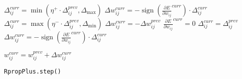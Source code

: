\begin{algorithm}
    \BlankLine
    \BlankLine

     { \BlankLine
         { \BlankLine \BlankLine
            $\Delta_{ij}^{curr} = \min(\eta^{+} \cdot \Delta_{ij}^{prev}, \Delta_{\max})$ \BlankLine
            $\Delta w_{ij}^{curr} = -\operatorname{sign}\left(\frac{\partial E}{\partial w_{ij}}^{curr}\right) \cdot \Delta_{ij}^{curr}$
        }
         { \BlankLine \BlankLine
            $\Delta_{ij}^{curr} = \max(\eta^{-} \cdot \Delta_{ij}^{prev}, \Delta_{\min})$ \BlankLine
            $\Delta w_{ij}^{curr} = -\Delta w_{ij}^{prev}$ \BlankLine
            ${\frac{\partial E}{\partial w_{ij}}}^{curr} = 0$
        }
         { \BlankLine \BlankLine
            $\Delta_{ij}^{curr} = \Delta_{ij}^{prev}$ \BlankLine
            $\Delta w_{ij}^{curr} = -\operatorname{sign}\left(\frac{\partial E}{\partial w_{ij}}^{curr}\right) \cdot \Delta_{ij}^{curr}$
        } \BlankLine \BlankLine

        $w_{ij}^{curr} = w_{ij}^{prev} + \Delta w_{ij}^{curr}$
    }

    \caption{\texttt{RpropPlus.step()}}
    \label{alg:rpropplus}
\end{algorithm}